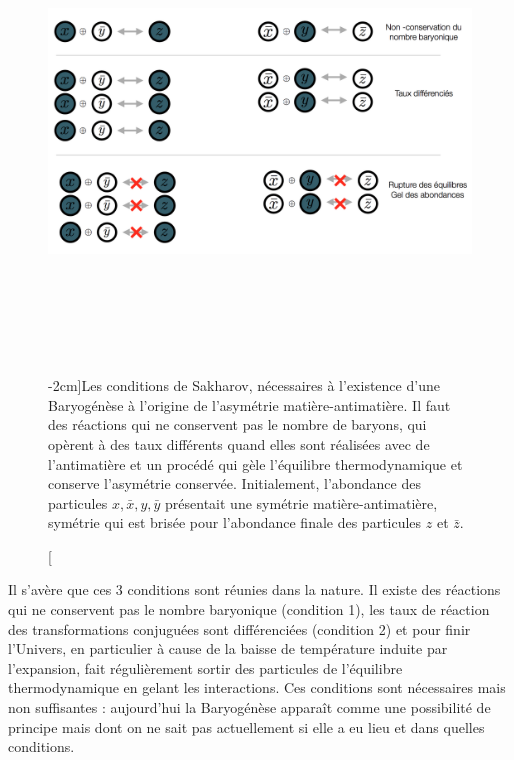 \begin{figure}[htbp]
	\centering
		\includegraphics[height=12cm]{figs/sakharov.png}
	\caption[Les conditions de Sakharov][-2cm]{Les conditions de Sakharov, nécessaires à l'existence d'une Baryogénèse à l'origine de l'asymétrie matière-antimatière. Il faut des réactions qui ne conservent pas le nombre de baryons, qui opèrent à des taux différents quand elles sont réalisées avec de l'antimatière et un procédé qui gèle l'équilibre thermodynamique et conserve l'asymétrie conservée. Initialement, l'abondance des particules $x,\bar x, y, \bar y$ présentait une symétrie matière-antimatière, symétrie qui est brisée pour l'abondance finale des particules $z$ et $\bar z$.}
	\label{f:sakharov}
\end{figure}

 Il s'avère que ces 3 conditions sont réunies dans la nature. Il existe des réactions qui ne conservent pas le nombre baryonique (condition 1), les taux de réaction des transformations conjuguées sont différenciées (condition 2) et pour finir l'Univers, en particulier à cause de la baisse de température induite par l'expansion, fait régulièrement sortir des particules de l'équilibre thermodynamique en gelant les interactions. Ces conditions sont nécessaires mais non suffisantes : aujourd'hui la Baryogénèse apparaît comme une possibilité de principe mais dont on ne sait pas actuellement si elle a eu lieu et dans quelles conditions.
 